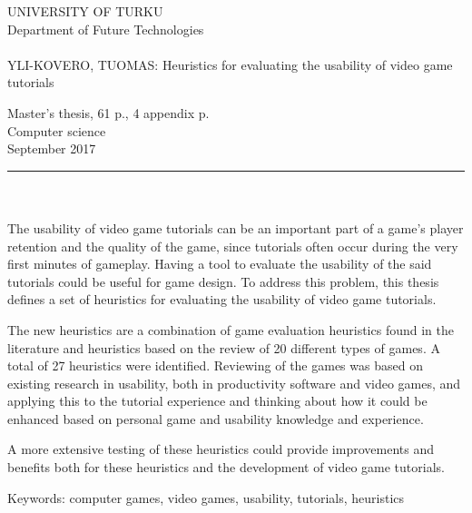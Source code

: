 \documentclass[12pt, a4paper]{report}
\begin{document}
\begin{minipage}{15cm}
	\pagestyle{empty}
	\noindent
	UNIVERSITY OF TURKU\\
	Department of Future Technologies\\
	\\
	YLI-KOVERO, TUOMAS: Heuristics for evaluating the usability of video game tutorials
	
	Master's thesis, 61 p., 4 appendix p.\\
	Computer science\\
	September 2017\\
	\rule{\textwidth}{.2mm}\\
	\\
	The usability of video game tutorials can be an important part of a game's player retention and the quality of the game, since tutorials often occur during the very first minutes of gameplay. Having a tool to evaluate the usability of the said tutorials could be useful for game design. To address this problem, this thesis defines a set of heuristics for evaluating the usability of video game tutorials.
	
	\vspace{4mm}\noindent The new heuristics are a combination of game evaluation heuristics found in the literature and heuristics based on the review of 20 different types of games. A total of 27 heuristics were identified. Reviewing of the games was based on existing research in usability, both in productivity software and video games, and applying this to the tutorial experience and thinking about how it could be enhanced based on personal game and usability knowledge and experience.
	
	\vspace{4mm}\noindent A more extensive testing of these heuristics could provide improvements and benefits both for these heuristics and the development of video game tutorials. 
	
	\vspace{4mm}\noindent Keywords: computer games, video games, usability, tutorials, heuristics
	
\end{minipage}
\end{document}
